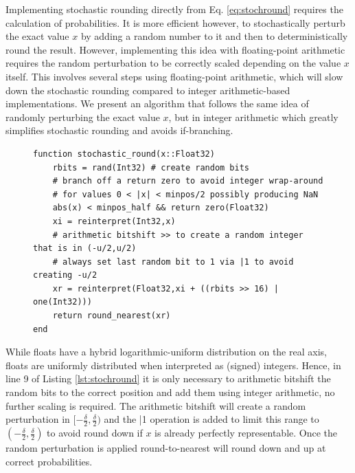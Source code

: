 Implementing stochastic rounding directly from Eq. \ref{eq:stochround} requires the calculation of probabilities. It is more efficient however, to stochastically
perturb the exact value $x$ by adding a random number to it and then to deterministically round the result. However, implementing this idea with
floating-point arithmetic requires the random perturbation to be correctly scaled depending on the value $x$ itself. This involves several steps using
floating-point arithmetic, which will slow down the stochastic rounding compared to integer arithmetic-based implementations. We present an algorithm
that follows the same idea of randomly perturbing the exact value $x$, but in integer arithmetic which greatly simplifies stochastic rounding and 
avoids if-branching.

\begin{figure}[tbhp]
\begin{lstlisting}[language=JuliaLocal, label=lst:stochround, caption={\textbf{Efficient bitwise stochastic rounding with integer
arithmetic as implemented by StochasticRounding.jl} Example algorithm rounding Float32 to $n_f = 7$ mantissa bits as in Listing \ref{lst:bitshave}.
\texttt{rand(Int32)} creates 32 random bits with equal probabilities that are interpreted as Int32. Any pseudo random number generator can be used.
Line 5 returns zero if $\vert x \vert < \tfrac{1}{2}minpos$, $\mathtt{minpos\_half} = 2^{2-2^{n_e - 1} - (n_f + 1)} = \mathtt{0x0000\_8000}$ is a
constant defined globally (Eq. \ref{eq:float_all}).}]
function stochastic_round(x::Float32)
	rbits = rand(Int32)	# create random bits
	# branch off a return zero to avoid integer wrap-around
	# for values 0 < |x| < minpos/2 possibly producing NaN
	abs(x) < minpos_half && return zero(Float32)
	xi = reinterpret(Int32,x)
	# arithmetic bitshift >> to create a random integer that is in (-u/2,u/2)
	# always set last random bit to 1 via |1 to avoid creating -u/2
	xr = reinterpret(Float32,xi + ((rbits >> 16) | one(Int32)))
	return round_nearest(xr)
end
\end{lstlisting}
\end{figure}
While floats have a hybrid logarithmic-uniform distribution on the real axis, floats are uniformly distributed when interpreted as (signed) integers.
Hence, in line 9 of Listing \ref{lst:stochround} it is only necessary to arithmetic bitshift the random bits to the correct position and add them using
integer arithmetic, no further scaling is required. The arithmetic bitshift will create a random perturbation in $[-\tfrac{\delta}{2},\tfrac{\delta}{2})$
and the |1 operation is added to limit this range to $(-\tfrac{\delta}{2},\tfrac{\delta}{2})$ to avoid round down if $x$ is already perfectly representable.
Once the random perturbation is applied round-to-nearest will round down and up at correct probabilities. 

